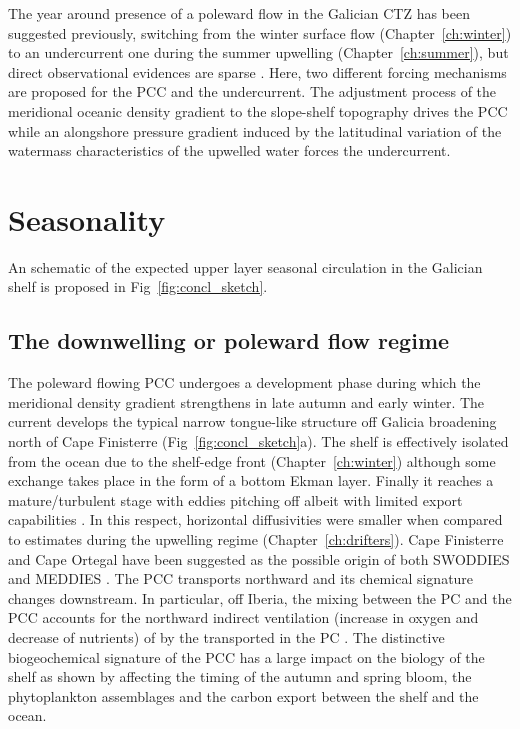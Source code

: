 The year around presence of a poleward flow in the Galician CTZ
has been suggested previously, switching from the winter surface
flow (Chapter~\ref{ch:winter}) to an undercurrent one during the
summer upwelling (Chapter~\ref{ch:summer}), but direct
observational evidences are sparse \citep{Barton90}. Here, two
different forcing mechanisms are proposed for the PCC and the
undercurrent. The adjustment process of the meridional oceanic
density gradient to the slope-shelf topography drives the PCC
while an alongshore pressure gradient induced by the latitudinal
variation of the watermass characteristics of the upwelled water
forces the undercurrent.

\section{Seasonality} An schematic of the expected upper layer seasonal
circulation in the Galician shelf is proposed in
Fig~\ref{fig:concl_sketch}.
\subsection{The downwelling or poleward flow regime}
The poleward flowing PCC undergoes a development phase during
which the meridional density gradient strengthens in late autumn
and early winter. The current develops the typical narrow
tongue-like structure off Galicia broadening north of Cape
Finisterre (Fig~\ref{fig:concl_sketch}a). The shelf is effectively
isolated from the ocean due to the shelf-edge front
(Chapter~\ref{ch:winter}) although some exchange takes place in
the form of a bottom Ekman layer. Finally it reaches a
mature/turbulent stage with eddies pitching off albeit with
limited export capabilities \citep{Huthnance02}. In this respect,
horizontal diffusivities were smaller when compared to estimates
during the upwelling regime (Chapter~\ref{ch:drifters}). Cape
Finisterre and Cape Ortegal have been suggested as the possible
origin of both SWODDIES \citep{Pingree92} and MEDDIES
\citep{Paillet02}. The PCC transports \enawt northward and its
chemical signature changes downstream. In particular, off Iberia,
the mixing between the PC and the PCC accounts for the northward
indirect ventilation (increase in oxygen and decrease of
nutrients) of \enawt by the \enawp transported in the PC
\citep{Perez01}. The distinctive biogeochemical signature of the
PCC has a large impact on the biology of the shelf as shown by
\citet{Alvarez-Salgado03} affecting the timing of the autumn and
spring bloom, the phytoplankton assemblages and the carbon export
between the shelf and the ocean.

